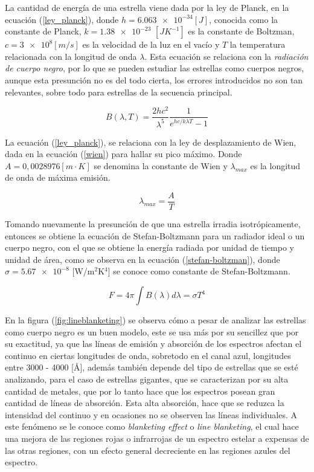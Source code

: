 \documentclass[12pt,oneside,openany,letter]{book}
\begin{document}
\noindent La cantidad de energía de una estrella viene dada por la ley de Planck, en la ecuación (\ref{ley_planck}), donde $h = \num{6.063e-34} [J]$, conocida como la constante de Planck, $k = \num{1.38e-23}$ $[JK^{-1}]$ es la constante de Boltzman, $c= \num{3e8} [m/s]$ es la velocidad de la luz en el vacío y $T$ la temperatura relacionada con la longitud de onda $\lambda$. Esta ecuación se relaciona con la \textit{radiación de cuerpo negro}, por lo que se pueden estudiar las estrellas como cuerpos negros, aunque esta presunción no es del todo cierta, los errores introducidos no son tan relevantes, sobre todo para estrellas de la secuencia principal.

\begin{equation}
    B(\lambda,T) = \frac{2h c^2}{\lambda^5} \frac{1}{e^{h c/k\lambda T}-1}
    \label{ley_planck}
\end{equation}

\noindent La ecuación (\ref{ley_planck}), se relaciona con la ley de desplazamiento de Wien, dada en la ecuación (\ref{wien}) para hallar su pico máximo. Donde $A = 0,0028976 [m\cdot K]$ se denomina la constante de Wien y $\lambda_{max}$ es la longitud de onda de máxima emisión.

\begin{equation}
    \lambda_{max} =  \frac{A}{T}
    \label{wien}
\end{equation}

\noindent Tomando nuevamente la presunción de que una estrella irradia isotrópicamente, entonces se obtiene la ecuación de Stefan-Boltzmann para un radiador ideal o un cuerpo negro, con el que se obtiene la energía radiada por unidad de tiempo y unidad de área, como se observa en la ecuación (\ref{stefan-boltzman}), donde $\sigma = \num{5,67 e-8}$ [W/m$^2$K$^4$] se conoce como constante de Stefan-Boltzmann.
\vspace{2mm}

\begin{equation}
    F = 4 \pi \int B(\lambda)  d\lambda = \sigma T^4
    \label{stefan-boltzman}
\end{equation}

\noindent En la figura  (\ref{fig:lineblanketing}) se observa cómo a pesar de analizar las estrellas como cuerpo negro es un buen modelo, este se usa más por su sencillez que por su exactitud, ya que las líneas de emisión y absorción de los espectros afectan el continuo en ciertas longitudes de onda, sobretodo en el canal azul, longitudes entre 3000 - 4000 [\r{A}], además también depende del tipo de estrellas que se esté analizando, para el caso de estrellas gigantes, que se caracterizan por su alta cantidad de metales, que por lo tanto hace que los espectros posean gran cantidad de líneas de absorción. Esta alta absorción, hace que se reduzca la intensidad del continuo y en ocasiones no se observen las líneas individuales. A este fenómeno se le conoce como \textit{blanketing effect} o \textit{line blanketing}, el cual hace una mejora de las regiones rojas o infrarrojas de un espectro estelar a expensas de las otras regiones, con un efecto general decreciente en las regiones azules del espectro.
\end{document}
